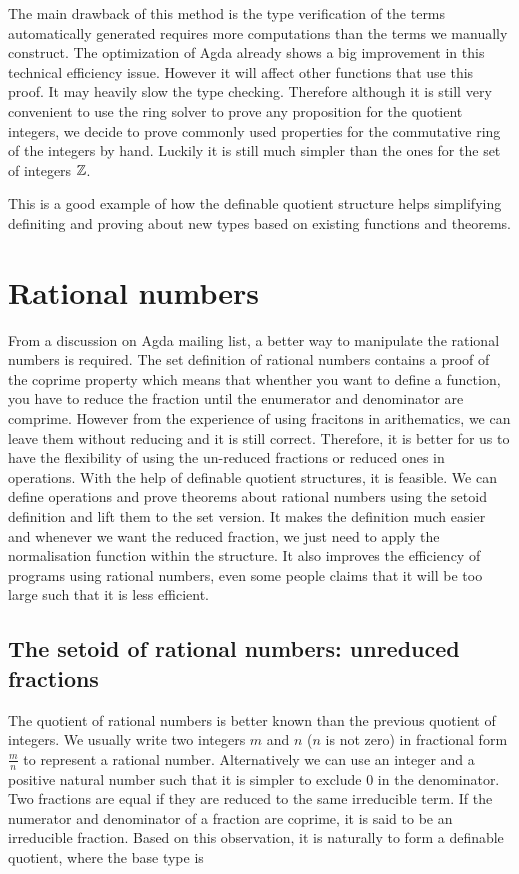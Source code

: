 The main drawback of this method is the type verification of the
terms automatically generated requires more computations than the terms
we manually construct. The optimization of Agda already shows a big
improvement in this technical efficiency issue. However it will affect
other functions that use this proof. It may heavily slow the type
checking.
Therefore although it is still very convenient to use the ring solver to prove any proposition for the quotient
integers, we decide to prove commonly used properties for the commutative
ring of the integers by hand. Luckily it is still much simpler than the ones
for the set of integers $\mathbb{Z}$.


This is a good example of how the definable quotient structure helps
simplifying definiting and proving about new types based on existing
functions and theorems. 


\section{Rational numbers}

From a discussion on Agda mailing list, a better way to manipulate the
rational numbers is required. The set definition of rational numbers
contains a proof of the coprime property which means that whenther you
want to define a function, you have to reduce the fraction until the
enumerator and denominator are comprime. However from the experience
of using fracitons in arithematics, we can leave them without reducing
and it is still correct. Therefore, it is better for us to have the
flexibility of using the un-reduced fractions or reduced ones in
operations. With the help of definable quotient structures, it is
feasible. We can define operations and prove theorems about rational
numbers using the setoid definition and lift them to the set
version. It makes the definition much easier and whenever we want the
reduced fraction, we just need to apply the normalisation function
within the structure. It also improves the efficiency of programs
using rational numbers, even some people claims that it will be too
large such that it is less efficient.


\subsection{The setoid of rational numbers: unreduced fractions}

The quotient of rational numbers is better known than the previous
quotient of integers. We usually write two integers $m$ and $n$ ($n$ is not zero) in
fractional form $\frac{m}{n}$ to represent a rational number. Alternatively we
can use an integer and a positive natural number such that it is
simpler to exclude 0 in the denominator. Two fractions are equal if
they are reduced to the same irreducible term. If the numerator and
denominator of a fraction are coprime, it is said to be an irreducible
fraction. Based on this observation, it is naturally to form a definable quotient, where the base type is 

